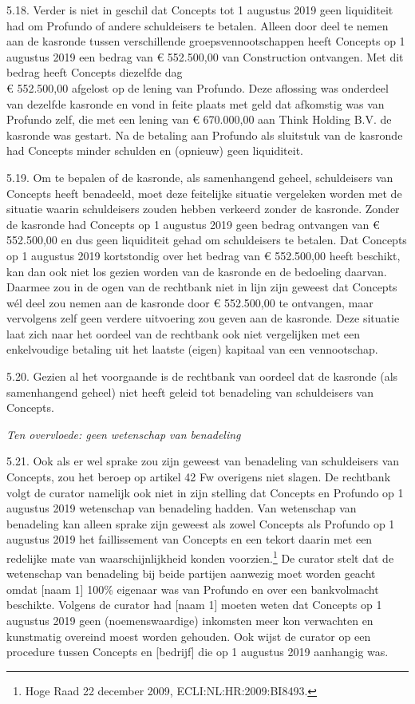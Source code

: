 \documentclass[
  dutch,
  a4paper,
]{article}
\begin{document}
5.18. Verder is niet in geschil dat Concepts tot 1 augustus 2019 geen liquiditeit had om Profundo of andere schuldeisers te betalen. Alleen door deel te nemen aan de kasronde tussen verschillende groepsvennootschappen heeft Concepts op 1 augustus 2019 een bedrag van € 552.500,00 van Construction ontvangen. Met dit bedrag heeft Concepts diezelfde dag\\
€ 552.500,00 afgelost op de lening van Profundo. Deze aflossing was onderdeel van dezelfde kasronde en vond in feite plaats met geld dat afkomstig was van Profundo zelf, die met een lening van € 670.000,00 aan Think Holding B.V. de kasronde was gestart. Na de betaling aan Profundo als sluitstuk van de kasronde had Concepts minder schulden en (opnieuw) geen liquiditeit.

5.19. Om te bepalen of de kasronde, als samenhangend geheel, schuldeisers van Concepts heeft benadeeld, moet deze feitelijke situatie vergeleken worden met de situatie waarin schuldeisers zouden hebben verkeerd zonder de kasronde. Zonder de kasronde had Concepts op 1 augustus 2019 geen bedrag ontvangen van € 552.500,00 en dus geen liquiditeit gehad om schuldeisers te betalen. Dat Concepts op 1 augustus 2019 kortstondig over het bedrag van € 552.500,00 heeft beschikt, kan dan ook niet los gezien worden van de kasronde en de bedoeling daarvan. Daarmee zou in de ogen van de rechtbank niet in lijn zijn geweest dat Concepts wél deel zou nemen aan de kasronde door € 552.500,00 te ontvangen, maar vervolgens zelf geen verdere uitvoering zou geven aan de kasronde. Deze situatie laat zich naar het oordeel van de rechtbank ook niet vergelijken met een enkelvoudige betaling uit het laatste (eigen) kapitaal van een vennootschap.

5.20. Gezien al het voorgaande is de rechtbank van oordeel dat de kasronde (als samenhangend geheel) niet heeft geleid tot benadeling van schuldeisers van Concepts.

\emph{Ten overvloede: geen wetenschap van benadeling}

5.21. Ook als er wel sprake zou zijn geweest van benadeling van schuldeisers van Concepts, zou het beroep op artikel 42 Fw overigens niet slagen. De rechtbank volgt de curator namelijk ook niet in zijn stelling dat Concepts en Profundo op 1 augustus 2019 wetenschap van benadeling hadden. Van wetenschap van benadeling kan alleen sprake zijn geweest als zowel Concepts als Profundo op 1 augustus 2019 het faillissement van Concepts en een tekort daarin met een redelijke mate van waarschijnlijkheid konden voorzien.\footnote{Hoge Raad 22 december 2009, ECLI:NL:HR:2009:BI8493.} De curator stelt dat de wetenschap van benadeling bij beide partijen aanwezig moet worden geacht omdat {[}naam 1{]} 100\% eigenaar was van Profundo en over een bankvolmacht beschikte. Volgens de curator had {[}naam 1{]} moeten weten dat Concepts op 1 augustus 2019 geen (noemenswaardige) inkomsten meer kon verwachten en kunstmatig overeind moest worden gehouden. Ook wijst de curator op een procedure tussen Concepts en {[}bedrijf{]} die op 1 augustus 2019 aanhangig was.
\end{document}
